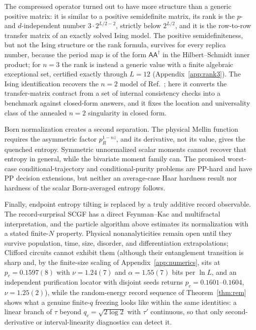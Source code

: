 \documentclass[aps,prx,reprint,superscriptaddress,nobibnotes,longbibliography]{revtex4-2}
\theoremstyle{remark}
\begin{document}
The compressed operator turned out to have more structure than a generic positive matrix: it is similar to a positive semidefinite matrix, its rank is the $p$- and $d$-independent number $3\cdot2^{L/2-2}$, strictly below $2^{L/2}$, and it is the row-to-row transfer matrix of an exactly solved Ising model.  The positive semidefiniteness, but not the Ising structure or the rank formula, survives for every replica number, because the period map is of the form $\mathsf A\mathsf A^\dagger$ in the Hilbert--Schmidt inner product; for $n=3$ the rank is instead a generic value with a finite algebraic exceptional set, certified exactly through $L=12$ (Appendix~\ref{app:rank3}).  The Ising identification recovers the $n=2$ model of Ref.~\cite{Bao2020}; here it converts the transfer-matrix contract from a set of internal consistency checks into a benchmark against closed-form answers, and it fixes the location and universality class of the annealed $n=2$ singularity in closed form.

Born normalization creates a second separation.  The physical Mellin function requires the asymmetric factor $p_R^{1-nz}$, and its derivative, not its value, gives the quenched entropy.  Symmetric unnormalized scalar moments cannot recover that entropy in general, while the bivariate moment family can.  The promised worst-case conditional-trajectory and conditional-purity problems are PP-hard and have PP decision extensions, but neither an average-case Haar hardness result nor hardness of the scalar Born-averaged entropy follows.

Finally, endpoint entropy tilting is replaced by a truly additive record observable.  The record-surprisal SCGF has a direct Feynman--Kac and multifractal interpretation, and the particle algorithm above estimates its normalization with a stated finite-$N$ property.  Physical nonanalyticities remain open until they survive population, time, size, disorder, and differentiation extrapolations; Clifford circuits cannot exhibit them (although their entanglement transition is sharp and, by the finite-size scaling of Appendix~\ref{app:numerics}, sits at $p_c=0.1597(8)$ with $\nu=1.24(7)$ and $\alpha=1.55(7)$ bits per $\ln L$, and an independent purification locator with disjoint seeds returns $p_c=0.1601$--$0.1604$, $\nu=1.25(2)$), while the random-energy record sequence of Theorem~\ref{thm:rem} shows what a genuine finite-$q$ freezing looks like within the same identities: a linear branch of $\tau$ beyond $q_c=\sqrt{2\log2}$ with $\tau'$ continuous, so that only second-derivative or interval-linearity diagnostics can detect it.
\end{document}
